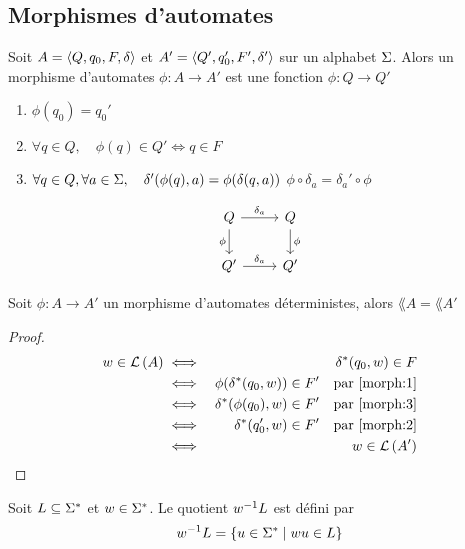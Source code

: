 \subsection{Morphismes d'automates}

\begin{definition}
	Soit $A = \langle Q, q_0, F, \delta \rangle$ et $ A' = \langle Q', q_0', F', \delta' \rangle $ sur un alphabet $\Sigma$.
	Alors un morphisme d'automates $\phi: A \to A'$ est une fonction $\phi: Q \to Q'$ \tlq
	\begin{enumerate}
		\item $\phi (q_0) = q_0'$ \label{morph:1}
		\item $\forall q \in Q,\quad  \phi (q) \in Q' \iff q \in F$ \label{morph:2}
		\item $\forall q \in Q, \forall a \in \Sigma,\quad \delta'(\phi (q), a) = \phi (\delta(q,a))$ \ie $\phi \circ \delta_a = \delta_a '\circ \phi$ \label{morph:3}
	\end{enumerate}

	\[
		\begin{tikzcd}
			Q \arrow{r}{\delta_a} \arrow[swap]{d}{\phi} & Q \arrow{d}{\phi} \\
			Q' \arrow{r}{\delta_a} & Q'
		\end{tikzcd}
	\]

\end{definition}


\begin{exercice}
	Soit $\phi : A \to A'$ un morphisme d'automates déterministes, alors $\lang A = \lang {A'}$
\end{exercice}

\begin{proof}
	\begin{eqnarray*}
		w \in \mathcal{L}\left(A\right) &\iff& \delta^{*} (q_0, w) \in F \\
		&\iff& \phi (\delta^{*} (q_0, w)) \in F' \quad \text{par } \ref{morph:1} \\
		&\iff& \delta^{*}( \phi (q_0), w) \in F' \quad \text{par } \ref{morph:3} \\
		&\iff& \delta^{*}( q_0', w) \in F' \quad \text{par } \ref{morph:2} \\
		&\iff& w \in \mathcal{L}\left(A'\right)
	\end{eqnarray*}
\end{proof}


\begin{definition}
	Soit $L \subseteq \Sigma^{*}$ et $w \in \Sigma^{*}$. Le quotient $w^{-1} L$ est défini par
	$$ w^{-1} L = \left\{u \in \Sigma^{*} \mid wu \in L\right\} $$
\end{definition}

